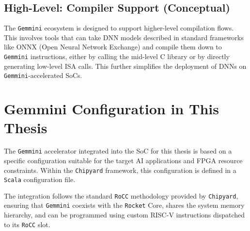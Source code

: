 \subsection{High-Level: Compiler Support (Conceptual)}
The \texttt{Gemmini} ecosystem is designed to support higher-level compilation flows. This involves tools that can take DNN models described in standard frameworks like ONNX (Open Neural Network Exchange) and compile them down to \texttt{Gemmini} instructions, either by calling the mid-level C library or by directly generating low-level ISA calls. This further simplifies the deployment of DNNs on \texttt{Gemmini}-accelerated SoCs.

\section{Gemmini Configuration in This Thesis}
\label{sec:gemmini_configuration}

The \texttt{Gemmini} accelerator integrated into the SoC for this thesis is based on a specific configuration suitable for the target AI applications and FPGA resource constraints. Within the \texttt{Chipyard} framework, this configuration is defined in a \texttt{Scala} configuration file. 

The integration follows the standard \texttt{RoCC} methodology provided by \texttt{Chipyard}, ensuring that \texttt{Gemmini} coexists with the \texttt{Rocket} Core, shares the system memory hierarchy, and can be programmed using custom RISC-V instructions dispatched to its \texttt{RoCC} slot.